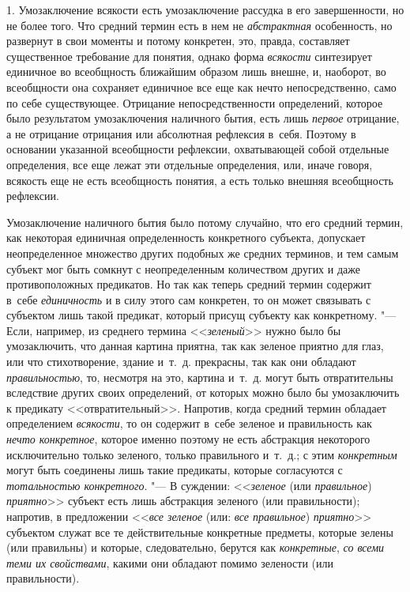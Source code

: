 1. Умозаключение всякости есть умозаключение рассудка в его
завершенности, но не более того. Что средний термин есть в нем не
{\em абстрактная}
особенность, но развернут в свои моменты и потому конкретен,
это, правда, составляет существенное требование для понятия, однако форма
{\em всякости}
синтезирует единичное во всеобщность ближайшим образом лишь
внешне, и, наоборот, во всеобщности она сохраняет единичное все еще как
нечто непосредственно, само по себе существующее. Отрицание
непосредственности определений, которое было результатом умозаключения
наличного бытия, есть лишь {\em первое}
отрицание, а не отрицание отрицания или абсолютная рефлексия
в~себя. Поэтому в основании указанной всеобщности рефлексии, охватывающей
собой отдельные определения, все еще лежат эти отдельные определения, или,
иначе говоря, всякость еще не есть всеобщность понятия, а есть только
внешняя всеобщность рефлексии.

Умозаключение наличного бытия было потому случайно, что его
средний термин, как некоторая единичная определенность конкретного
субъекта, допускает неопределенное множество других подобных же средних
терминов, и тем самым субъект мог быть сомкнут с неопределенным количеством
других и даже противоположных предикатов. Но так как теперь средний термин
содержит в~себе {\em единичность}
и в силу этого сам конкретен, то он может связывать с
субъектом лишь такой предикат, который присущ субъекту как конкретному. "---
Если, например, из среднего термина
<<{\em зеленый}>> нужно
было бы умозаключить, что данная картина приятна, так как зеленое приятно
для глаз, или что стихотворение, здание и~т.~д. прекрасны, так как они
обладают {\em правильностью},
то, несмотря на это, картина и~т.~д. могут быть отвратительны
вследствие других своих определений, от которых можно было бы умозаключить
к предикату <<отвратительный>>. Напротив, когда средний термин обладает
определением {\em всякости},
то он содержит в~себе зеленое и правильность как
{\em нечто конкретное},
которое именно поэтому не есть абстракция некоторого
исключительно только зеленого, только правильного и~т.~д.; с этим
{\em конкретным} могут
быть соединены лишь такие предикаты, которые согласуются с
{\em тотальностью конкретного}. "---
В суждении:
<<{\em зеленое} (или
{\em правильное})
{\em приятно}>> субъект
есть лишь абстракция зеленого (или правильности); напротив, в предложении
<<{\em все зеленое} (или:
{\em все правильное})
{\em приятно}>> субъектом
служат все те действительные конкретные предметы, которые зелены (или
правильны) и которые, следовательно, берутся как
{\em конкретные},
{\em со всеми теми их свойствами},
какими они обладают помимо зелености (или правильности).

